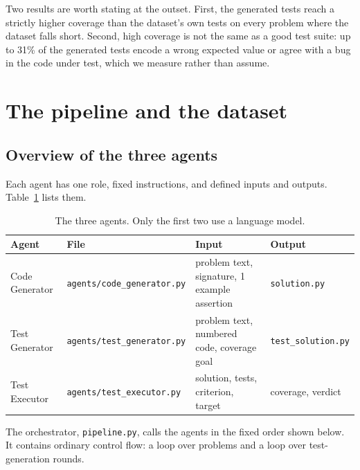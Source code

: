 \documentclass[11pt,a4paper]{article}
\begin{document}
Two results are worth stating at the outset. First, the generated tests reach a strictly higher coverage than
the dataset's own tests on every problem where the dataset falls short. Second, high coverage is not the same
as a good test suite: up to 31\% of the generated tests encode a wrong expected value or agree with a bug in
the code under test, which we measure rather than assume.

\section{The pipeline and the dataset}
\label{sec:pipeline}

\subsection{Overview of the three agents}

Each agent has one role, fixed instructions, and defined inputs and outputs. Table~\ref{tab:agents} lists them.

\begin{table}[htbp]
\centering
\small
\caption{The three agents. Only the first two use a language model.}
\label{tab:agents}
\begin{tabular}{@{}llll@{}}
\toprule
\textbf{Agent} & \textbf{File} & \textbf{Input} & \textbf{Output} \\
\midrule
Code Generator & \texttt{agents/code\_generator.py} & problem text, signature, 1 example assertion & \texttt{solution.py} \\
Test Generator & \texttt{agents/test\_generator.py} & problem text, numbered code, coverage goal & \texttt{test\_solution.py} \\
Test Executor & \texttt{agents/test\_executor.py} & solution, tests, criterion, target & coverage, verdict \\
\bottomrule
\end{tabular}
\end{table}

The orchestrator, \texttt{pipeline.py}, calls the agents in the fixed order shown below. It contains ordinary
control flow: a loop over problems and a loop over test-generation rounds.
\end{document}
